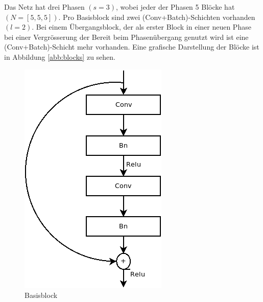 Das Netz hat drei Phasen $(s=3)$, wobei jeder der Phasen 5 Blöcke hat $(N=[5,5,5])$. Pro Basisblock sind zwei (Conv+Batch)-Schichten vorhanden $(l=2)$. Bei einem Übergangsblock, der als erster Block in einer neuen Phase bei einer Vergrösserung der Bereit beim Phasenübergang genutzt wird ist eine (Conv+Batch)-Schicht mehr vorhanden. Eine grafische Darstellung der Blöcke ist in Abbildung \ref{abb:blocks} zu sehen.




\begin{figure}[h]
   \begin{minipage}[b]{.4\linewidth} %
      \includegraphics[width=0.8\linewidth]{KapitelPartB/Images/Basisblock.png}
      \caption{Basisblock}
   \end{minipage}
   \hspace{.1\linewidth}%
   \begin{minipage}[b]{.4\linewidth} %

\end{minipage}
\end{figure}
